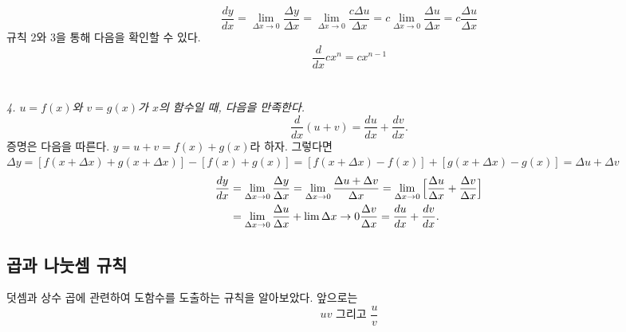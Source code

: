 \documentclass{article}
\begin{document}
\[
    \frac{dy}{dx}=\lim_{\Delta x \to 0}\frac{\Delta y}{\Delta x} = \lim_{\Delta x \to 0}\frac{c\Delta u}{\Delta x}=c\lim_{\Delta x \to 0}\frac{\Delta u}{\Delta x}=c\frac{\Delta u}{\Delta x} 
\]
규칙 2와 3을 통해 다음을 확인할 수 있다.  
\[
    \frac{d}{dx}cx^n=cx^{n-1}
\]
\\\\
\textit{4. $u=f(x)$와 $v=g(x)$가 $x$의 함수일 때, 다음을 만족한다.}
\[
    \frac{d}{dx}(u+v)=\frac{du}{dx}+\frac{dv}{dx}.
\]
증명은 다음을 따른다. $y= u+v = f(x)+g(x)$라 하자. 그렇다면 $\Delta y=[f(x+\Delta x)+g(x+\Delta x)]-[f(x)+g(x)]= [f(x+\Delta x)-f(x)] + [g(x + \Delta x)-g(x)] = \Delta u + \Delta v$
\begin{align*}
    \frac{dy}{dx}&=\lim_{\Delta x \to 0}\frac{\Delta y}{\Delta x} = \lim_{\Delta x \to 0}\frac{\Delta u + \Delta v}{\Delta x}= \lim_{\Delta x \to 0}\Big{[}\frac{\Delta u}{\Delta x}+\frac{\Delta v}{\Delta x}\Big{]}\\
                 &=\lim_{\Delta x \to 0}\frac{\Delta u}{\Delta x} + \lim{\Delta x \to 0}\frac{\Delta v}{\Delta x}= \frac{du}{dx}+\frac{dv}{dx}.
\end{align*}

\subsection{곱과 나눗셈 규칙}

덧셈과 상수 곱에 관련하여 도함수를 도출하는 규칙을 알아보았다. 앞으로는
\[
    uv \text{ 그리고 } \frac{u}{v}
\]
\end{document}

